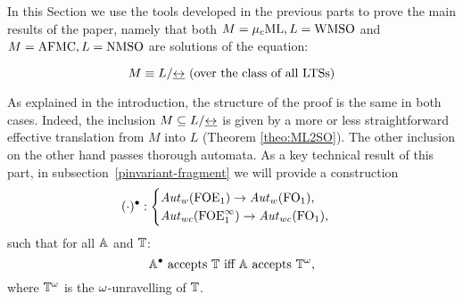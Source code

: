 In this Section we use the tools developed in the previous parts to prove  the main results of the paper, namely that both $M=\mu_{c}\textup{ML}, L=\mathrm{WMSO}$ and  $M=\mathrm{AFMC}, L=\mathrm{NMSO}$ are  solutions of the equation:

\begin{equation*}
M \equiv L / {\bis} \text{ (over the class of all LTSs)}
\end{equation*}



As explained in the introduction, the structure of the proof is the same in both cases. 
 Indeed, the inclusion $M \subseteq L / {\mathrel{\underline{\leftrightarrow}}} $ is  given by a more or less straightforward effective translation from $M$ into $L$ (Theorem \ref{theo:ML2SO}). 
 The other inclusion on the other hand passes thorough automata.
 As a key technical result of this part, in subsection~\ref{pinvariant-fragment}
we will provide a construction 
\[(\cdot)^{\bullet}: \begin{cases} \mathit{Aut}_{w}(\mathrm{FOE}_1) \to
\mathit{Aut}_{w}(\mathrm{FO}_1), \\
\mathit{Aut}_{wc}(\mathrm{FOE}^{\infty}_1) \to
\mathit{Aut}_{wc}(\mathrm{FO}_1), \\
\end{cases}\] 
such that for all $\mathbb{A}$ and $\mathbb{T}$: %
\begin{equation}
\label{eq:crux}
\bbA^{\bullet} \text{ accepts } \bbT \text{ iff } \bbA \text{ accepts
} \bbT^{\om},
\end{equation}
where $\mathbb{T}^{\omega}$ is the $\omega$-unravelling of $\mathbb{T}$.
 
 
 
 

